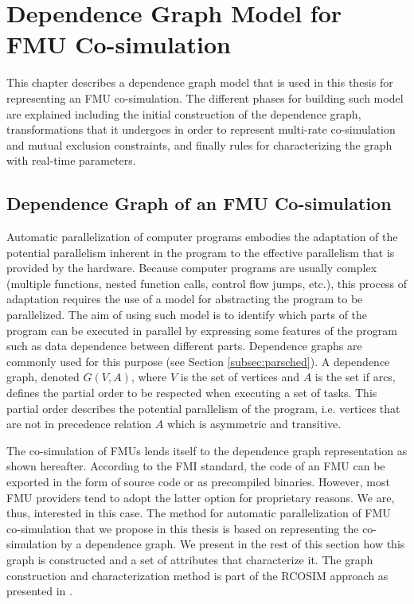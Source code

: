 \chapter{\label{ch:4-accel}Dependence Graph Model for FMU Co-simulation}

\minitoc

This chapter describes a dependence graph model that is used in this thesis for representing an FMU co-simulation. The different phases for building such model are explained including the initial construction of the dependence graph, transformations that it undergoes in order to represent multi-rate co-simulation and mutual exclusion constraints, and finally rules for characterizing the graph with real-time parameters.
 
\section{\label{sec:4-depgrph}Dependence Graph of an FMU Co-simulation}

Automatic parallelization of computer programs embodies the adaptation of the potential parallelism inherent in the program to the effective parallelism that is provided by the hardware. Because computer programs are usually complex (multiple functions, nested function calls, control flow jumps, etc.), this process of adaptation requires the use of a model for abstracting the program to be parallelized. The aim of using such model is to identify which parts of the program can be executed in parallel by expressing some features of the program such as data dependence between different parts. Dependence graphs are commonly used for this purpose (see Section \ref{subsec:parsched}). A dependence graph, denoted $G(V,A)$, where $V$ is the set of vertices and $A$ is the set if arcs, defines the partial order to be respected when executing a set of tasks. This partial order describes the potential parallelism of the program, i.e. vertices that are not in precedence relation $A$ which is asymmetric and transitive. %

The co-simulation of FMUs lends itself to the dependence graph representation as shown hereafter. According to the FMI standard, the code of an FMU can be exported in the form of source code or as precompiled binaries. However, most FMU providers tend to adopt the latter option for proprietary reasons. We are, thus, interested in this case. The method for automatic parallelization of FMU co-simulation that we propose in this thesis is based on representing the co-simulation by a dependence graph. We present in the rest of this section how this graph is constructed and a set of attributes that characterize it. The graph construction and characterization method is part of the RCOSIM approach as presented in \cite{benkhaled:2014}.

